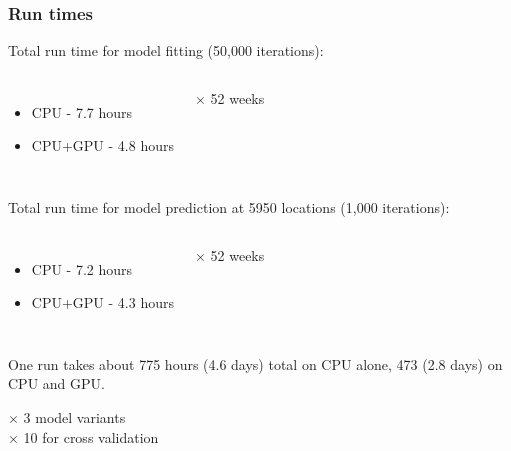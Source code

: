 \documentclass[t]{beamer}\usepackage[]{graphicx}\usepackage[]{color}
\begin{document}
\begin{frame}
\frametitle{Run times}

Total run time for model fitting (50,000 iterations): \\ \vspace{2mm}

\begin{columns}[c]
\begin{itemize}
\item CPU - 7.7 hours
\item CPU+GPU - 4.8 hours
\end{itemize}
$\times$ 52 weeks
\end{columns}


\vspace{7mm} \pause


Total run time for model prediction at 5950 locations (1,000 iterations): \\ \vspace{2mm}

\begin{columns}[c]
\begin{itemize}
\item CPU - 7.2 hours
\item CPU+GPU - 4.3 hours
\end{itemize}
$\times$ 52 weeks
\end{columns}

\vspace{7mm} \pause

One run takes about 775 hours (4.6 days) total on CPU alone, 473 (2.8 days) on CPU and GPU. 

\pause

\begin{center}
$\times$ 3 model variants\\
$\times$ 10 for cross validation
\end{center}

\end{frame}

\end{document}
